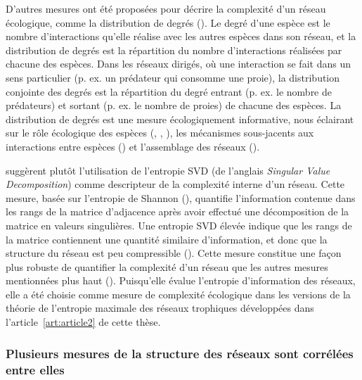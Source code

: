 D'autres mesures ont été proposées pour décrire la complexité d'un réseau
écologique, comme la distribution de degrés (\cite{Landi2018Complexity}). Le
degré d'une espèce est le nombre d'interactions qu'elle réalise avec les autres
espèces dans son réseau, et la distribution de degrés est la répartition du
nombre d'interactions réalisées par chacune des espèces. Dans les réseaux
dirigés, où une interaction se fait dans un sens particulier (p. ex. un
prédateur qui consomme une proie), la distribution conjointe des degrés est la
répartition du degré entrant (p. ex. le nombre de prédateurs) et sortant (p. ex.
le nombre de proies) de chacune des espèces. La distribution de degrés est une
mesure écologiquement informative, nous éclairant sur le rôle écologique des
espèces (\cite{Sole2001Complexity}, \cite{Dunne2002Network},
\cite{Memmott2004Tolerance}), les mécanismes sous-jacents aux interactions entre
espèces (\cite{Williams2011Biology}) et l'assemblage des réseaux
(\cite{Vazquez2005Degree}). 

\textcite{Strydom2021Svd} suggèrent plutôt l'utilisation de l'entropie SVD (de
l'anglais \textit{Singular Value Decomposition}) comme descripteur de la
complexité interne d'un réseau. Cette mesure, basée sur l'entropie de Shannon
(\cite{Shannon1948Mathematical}), quantifie l'information contenue dans les
rangs de la matrice d'adjacence après avoir effectué une décomposition de la
matrice en valeurs singulières. Une entropie SVD élevée indique que les rangs de
la matrice contiennent une quantité similaire d'information, et donc que la
structure du réseau est peu compressible (\cite{Gu2016How}). Cette mesure
constitue une façon plus robuste de quantifier la complexité d'un réseau que les
autres mesures mentionnées plus haut (\cite{Strydom2021Svd}). Puisqu'elle évalue
l'entropie d'information des réseaux, elle a été choisie comme mesure de
complexité écologique dans les versions de la théorie de l'entropie maximale des
réseaux trophiques développées dans l'article~\ref{art:article2} de cette thèse. 

\subsubsection{Plusieurs mesures de la structure des réseaux sont corrélées entre elles} 

